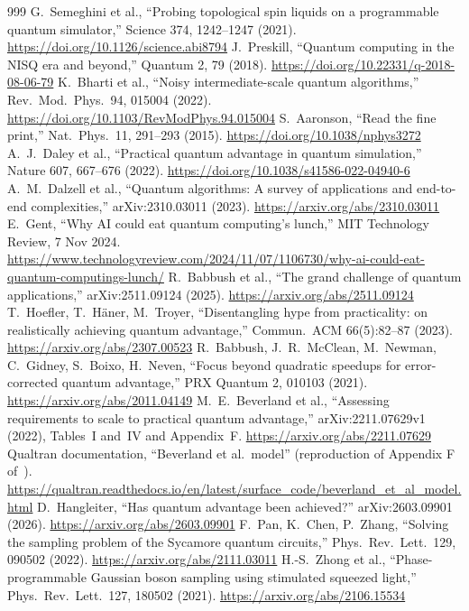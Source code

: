\documentclass[10pt,a4paper]{article}
\begin{document}
\begin{thebibliography}{999}
 G.~Semeghini et al., ``Probing topological spin liquids on a programmable quantum simulator,'' Science 374, 1242--1247 (2021). \url{https://doi.org/10.1126/science.abi8794}
 J.~Preskill, ``Quantum computing in the NISQ era and beyond,'' Quantum 2, 79 (2018). \url{https://doi.org/10.22331/q-2018-08-06-79}
 K.~Bharti et al., ``Noisy intermediate-scale quantum algorithms,'' Rev.\ Mod.\ Phys.\ 94, 015004 (2022). \url{https://doi.org/10.1103/RevModPhys.94.015004}
 S.~Aaronson, ``Read the fine print,'' Nat.\ Phys.\ 11, 291--293 (2015). \url{https://doi.org/10.1038/nphys3272}
 A.~J.~Daley et al., ``Practical quantum advantage in quantum simulation,'' Nature 607, 667--676 (2022). \url{https://doi.org/10.1038/s41586-022-04940-6}
 A.~M.~Dalzell et al., ``Quantum algorithms: A survey of applications and end-to-end complexities,'' arXiv:2310.03011 (2023). \url{https://arxiv.org/abs/2310.03011}
 E.~Gent, ``Why AI could eat quantum computing's lunch,'' MIT Technology Review, 7 Nov 2024. \url{https://www.technologyreview.com/2024/11/07/1106730/why-ai-could-eat-quantum-computings-lunch/}
 R.~Babbush et al., ``The grand challenge of quantum applications,'' arXiv:2511.09124 (2025). \url{https://arxiv.org/abs/2511.09124}
 T.~Hoefler, T.~H\"aner, M.~Troyer, ``Disentangling hype from practicality: on realistically achieving quantum advantage,'' Commun.\ ACM 66(5):82--87 (2023). \url{https://arxiv.org/abs/2307.00523}
 R.~Babbush, J.~R.~McClean, M.~Newman, C.~Gidney, S.~Boixo, H.~Neven, ``Focus beyond quadratic speedups for error-corrected quantum advantage,'' PRX Quantum 2, 010103 (2021). \url{https://arxiv.org/abs/2011.04149}
 M.~E.~Beverland et al., ``Assessing requirements to scale to practical quantum advantage,'' arXiv:2211.07629v1 (2022), Tables~I and~IV and Appendix~F. \url{https://arxiv.org/abs/2211.07629}
 Qualtran documentation, ``Beverland et al.\ model'' (reproduction of Appendix F of~\cite{beverland2022}). \url{https://qualtran.readthedocs.io/en/latest/surface_code/beverland_et_al_model.html}
 D.~Hangleiter, ``Has quantum advantage been achieved?'' arXiv:2603.09901 (2026). \url{https://arxiv.org/abs/2603.09901}
 F.~Pan, K.~Chen, P.~Zhang, ``Solving the sampling problem of the Sycamore quantum circuits,'' Phys.\ Rev.\ Lett.\ 129, 090502 (2022). \url{https://arxiv.org/abs/2111.03011}
 H.-S.~Zhong et al., ``Phase-programmable Gaussian boson sampling using stimulated squeezed light,'' Phys.\ Rev.\ Lett.\ 127, 180502 (2021). \url{https://arxiv.org/abs/2106.15534}


\end{thebibliography}
\end{document}
